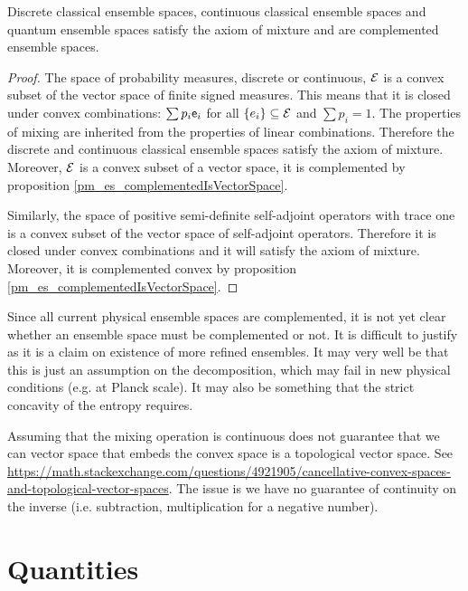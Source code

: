 \begin{prop}
	Discrete classical ensemble spaces, continuous classical ensemble spaces and quantum ensemble spaces satisfy the axiom of mixture and are complemented ensemble spaces.
\end{prop}

\begin{proof}
	The space of probability measures, discrete or continuous, $\mathcal{E}$ is a convex subset of the vector space of finite signed measures. This means that it is closed under convex combinations: $\sum p_i \mathsf{e}_i$ for all $\{e_i\} \subseteq \mathcal{E}$ and $\sum p_i = 1$. The properties of mixing are inherited from the properties of linear combinations. Therefore the discrete and continuous classical ensemble spaces satisfy the axiom of mixture. Moreover, $\mathcal{E}$ is a convex subset of a vector space, it is complemented by proposition \ref{pm_es_complementedIsVectorSpace}.
	
	Similarly, the space of positive semi-definite self-adjoint operators with trace one is a convex subset of the vector space of self-adjoint operators. Therefore it is closed under convex combinations and it will satisfy the axiom of mixture. Moreover, it is complemented convex by proposition \ref{pm_es_complementedIsVectorSpace}.
\end{proof}


\begin{remark}
	Since all current physical ensemble spaces are complemented, it is not yet clear whether an ensemble space must be complemented or not. It is difficult to justify as it is a claim on existence of more refined ensembles. It may very well be that this is just an assumption on the decomposition, which may fail in new physical conditions (e.g. at Planck scale). It may also be something that the strict concavity of the entropy requires.
\end{remark}

\begin{remark}
	Assuming that the mixing operation is continuous does not guarantee that we can vector space that embeds the convex space is a topological vector space. See \url{https://math.stackexchange.com/questions/4921905/cancellative-convex-spaces-and-topological-vector-spaces}. The issue is we have no guarantee of continuity on the inverse (i.e. subtraction, multiplication for a negative number).
\end{remark}


\section{Quantities}

